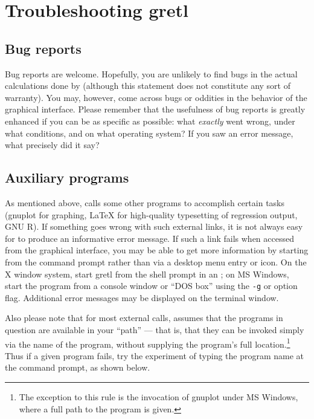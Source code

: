 \chapter{Troubleshooting gretl}
\label{trouble}

\section{Bug reports}
\label{trouble-bugs}

Bug reports are welcome. Hopefully, you are unlikely to find bugs in
the actual calculations done by  (although this statement
does not constitute any sort of warranty). You may, however, come
across bugs or oddities in the behavior of the graphical interface.
Please remember that the usefulness of bug reports is greatly enhanced
if you can be as specific as possible: what \emph{exactly} went wrong,
under what conditions, and on what operating system?  If you saw an
error message, what precisely did it say?

\section{Auxiliary programs}
\label{trouble-programs}

As mentioned above,  calls some other programs to
accomplish certain tasks (gnuplot for graphing, {\LaTeX} for
high-quality typesetting of regression output, GNU R).  If something
goes wrong with such external links, it is not always easy for
 to produce an informative error message.  If such a link
fails when accessed from the  graphical interface, you may
be able to get more information by starting  from the
command prompt rather than via a desktop menu entry or icon.  On the X
window system, start gretl from the shell prompt in an ; on
MS Windows, start the program  from a console window
or ``DOS box'' using the \verb|-g| or  option flag.
Additional error messages may be displayed on the terminal window.

Also please note that for most external calls,  assumes
that the programs in question are available in your ``path'' --- that
is, that they can be invoked simply via the name of the program,
without supplying the program's full location.\footnote{The exception
  to this rule is the invocation of gnuplot under MS Windows, where a
  full path to the program is given.}  Thus if a given program fails,
try the experiment of typing the program name at the command prompt,
as shown below.

